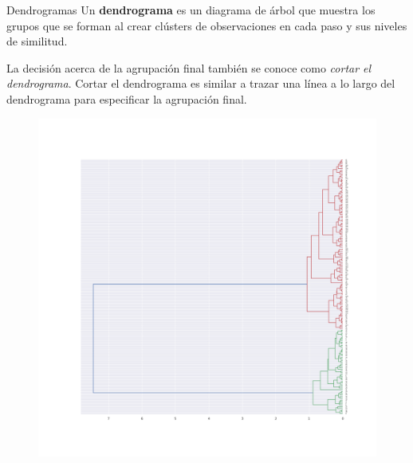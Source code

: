 \documentclass[spanish]{beamer}
\begin{document}
\begin{frame}{Dendrogramas}
Un \textbf{dendrograma} es un diagrama de árbol que muestra los grupos que se forman al crear clústers de observaciones en cada paso y sus niveles de similitud.\break

La decisión acerca de la agrupación final también se conoce como \textit{cortar el dendrograma}. Cortar el dendrograma es similar a trazar una línea a lo largo del dendrograma para especificar la agrupación final.
\end{frame}

\begin{frame}
\begin{figure}[h]
\centering
\includegraphics[scale=0.24]{dani/dendrogramAggClusterIRIS.png}
\end{figure}
\end{frame}
\end{document}
